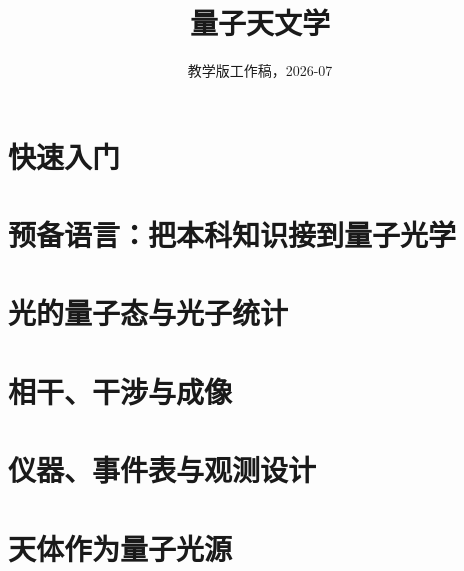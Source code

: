 \documentclass[11pt,openany,fontset=fandol]{ctexbook}
\title{量子天文学}
\author{\bookauthorblock}
\date{教学版工作稿，2026-07}
\begin{document}
\frontmatter
\qaModernCenteredLayout
\makebookimagecover
{}
\tableofcontents



\cleardoublepage
\qaModernBodyLayout
\mainmatter
\cleardoublepage
\part*{快速入门}



\part{预备语言：把本科知识接到量子光学}







\part{光的量子态与光子统计}




\part{相干、干涉与成像}





\part{仪器、事件表与观测设计}




\part{天体作为量子光源}





\end{document}
